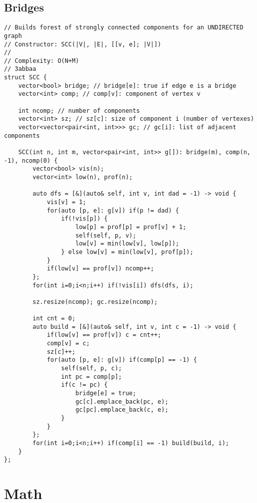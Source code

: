 \documentclass{article}
\begin{document}
\subsection{Bridges}
\begin{verbatim}
// Builds forest of strongly connected components for an UNDIRECTED graph
// Constructor: SCC(|V|, |E|, [[v, e]; |V|])
//
// Complexity: O(N+M)
// 3abbaa
struct SCC {
	vector<bool> bridge; // bridge[e]: true if edge e is a bridge
	vector<int> comp; // comp[v]: component of vertex v

	int ncomp; // number of components
	vector<int> sz; // sz[c]: size of component i (number of vertexes)
	vector<vector<pair<int, int>>> gc; // gc[i]: list of adjacent components
				
	SCC(int n, int m, vector<pair<int, int>> g[]): bridge(m), comp(n, -1), ncomp(0) {
		vector<bool> vis(n);
		vector<int> low(n), prof(n);

		auto dfs = [&](auto& self, int v, int dad = -1) -> void {
			vis[v] = 1;
			for(auto [p, e]: g[v]) if(p != dad) {
				if(!vis[p]) {
					low[p] = prof[p] = prof[v] + 1;
					self(self, p, v);
					low[v] = min(low[v], low[p]);
				} else low[v] = min(low[v], prof[p]);
			}
			if(low[v] == prof[v]) ncomp++;
		};
		for(int i=0;i<n;i++) if(!vis[i]) dfs(dfs, i);

		sz.resize(ncomp); gc.resize(ncomp);

		int cnt = 0;
		auto build = [&](auto& self, int v, int c = -1) -> void {
			if(low[v] == prof[v]) c = cnt++;
			comp[v] = c;
			sz[c]++;
			for(auto [p, e]: g[v]) if(comp[p] == -1) {
				self(self, p, c);
				int pc = comp[p];
				if(c != pc) {
					bridge[e] = true;
					gc[c].emplace_back(pc, e);
					gc[pc].emplace_back(c, e);
				}
			}
		};
		for(int i=0;i<n;i++) if(comp[i] == -1) build(build, i);
	}
};
\end{verbatim}
\section{Math}
\end{document}

